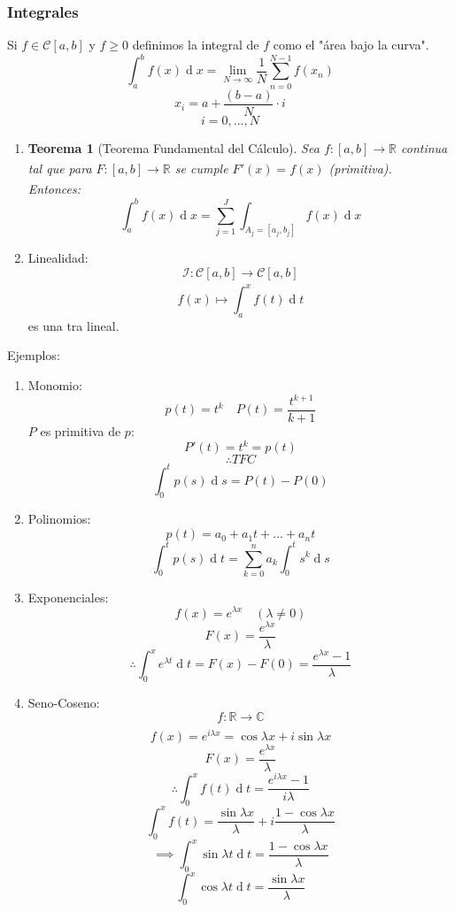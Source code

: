 \documentclass[11pt]{book}
\renewcommand{\d}[1]{\ensuremath{\operatorname{d}\!{#1}}}
\newcommand{\set}[1]{\mathbb{#1}}
\newcommand{\func}[5]{#1:#2\xrightarrow[#5]{#4}#3}
\newtheorem{thm}{Teorema}[section]
\theoremstyle{definition}
\begin{document}
\subsubsection{Integrales}
Si $f\in\mathcal{C}[a,b]$ y $f\geq 0$ definimos la integral de $f$ como el "área bajo la curva".
\[\int^b_a f(x)\d{x}=\lim_{N\rightarrow\infty}\frac{1}{N}\sum^{N-1}_{n=0}f(x_n)\]
\[x_i=a+\frac{(b-a)}{N}\cdot i\]
\[i=0,...,N\]
\begin{enumerate}
	\item \begin{thm}[Teorema Fundamental del Cálculo]
		      Sea $\func{f}{[a,b]}{\set{R}}{}{}$ continua tal que para $\func{F}{[a,b]}{\set{R}}{}{}$ se cumple $F'(x)=f(x)$ (primitiva).\\
		      Entonces:
		      \[\int^b_a f(x)\d{x}=\sum^J_{j=1}\int_{A_j=[a_j,b_j]}f(x)\d{x}\]
	      \end{thm}

	\item Linealidad:
	      \[\func{\mathcal{I}}{\mathcal{C}[a,b]}{\mathcal{C}[a,b]}{}{}\]
	      \[f(x)\mapsto\int^x_af(t)\d{t}\]
	      es una tra lineal.
\end{enumerate}
Ejemplos:
\begin{enumerate}
	\item Monomio:
	      \[p(t)=t^k\quad P(t)=\frac{t^{k+1}}{k+1}\]
	      $P$ es primitiva de $p$:
	      \[P'(t)=t^k=p(t)\]
	      \[\therefore TFC\]
	      \[\int^t_0p(s)\d{s}=P(t)-P(0)\]

	\item Polinomios:
	      \[p(t)=a_0+a_1t+...+a_nt\]
	      \[\int^t_0p(s)\d{t}=\sum^n_{k=0}a_k\int^t_0s^k\d{s}\]

	\item Exponenciales:
	      \[f(x)=e^{\lambda x}\quad(\lambda\neq 0)\]
	      \[F(x)=\frac{e^{\lambda x}}{\lambda}\]
	      \[\therefore \int^x_0e^{\lambda t}\d{t}=F(x)-F(0)=\frac{e^{\lambda x}-1}{\lambda}\]

	\item Seno-Coseno:
	      \[\func{f}{\set{R}}{\set{C}}{}{}\]
	      \[f(x)=e^{i\lambda x}=\cos\lambda x+i\sin\lambda x\]
	      \[F(x)=\frac{e^{\lambda x}}{\lambda}\]
	      \[\therefore\int^x_0f(t)\d{t}=\frac{e^{i\lambda x}-1}{i\lambda}\]
	      \[\int^x_0f(t)=\frac{\sin \lambda x}{\lambda}+i\frac{1-\cos \lambda x}{\lambda}\]
	      \[\implies \int^x_0\sin\lambda t\d{t}=\frac{1-\cos \lambda x}{\lambda}\]
	      \[\int^x_0\cos\lambda t\d{t}=\frac{\sin \lambda x}{\lambda}\]
\end{enumerate}
\end{document}
